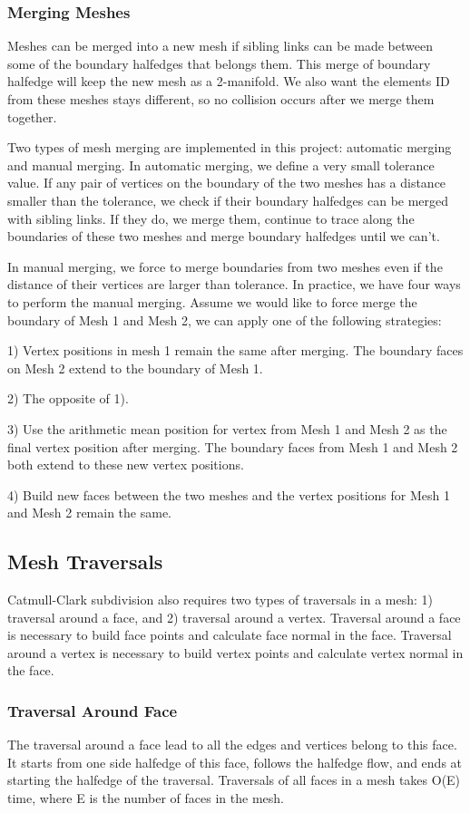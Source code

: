 \documentclass[12pt]{article}
\begin{document}
\subsubsection{Merging Meshes}
Meshes can be merged into a new mesh if sibling links can be made between some of the boundary halfedges that belongs them. This merge of boundary halfedge will keep the new mesh as a 2-manifold. We also want the elements ID from these meshes stays different, so no collision occurs after we merge them together.

Two types of mesh merging are implemented in this project: automatic merging and manual merging. In automatic merging, we define a very small tolerance value. If any pair of vertices on the boundary of the two meshes has a distance smaller than the tolerance, we check if their boundary halfedges can be merged with sibling links. If they do, we merge them, continue to trace along the boundaries of these two meshes and merge boundary halfedges until we can't.

In manual merging, we force to merge boundaries from two meshes even if the distance of their vertices are larger than tolerance. In practice, we have four ways to perform the manual merging. Assume we would like to force merge the boundary of Mesh 1 and Mesh 2, we can apply one of the following strategies:

1) Vertex positions in mesh 1 remain the same after merging. The boundary faces on Mesh 2 extend to the boundary of Mesh 1.

2) The opposite of 1).

3) Use the arithmetic mean position for vertex from Mesh 1 and Mesh 2 as the final vertex position after merging. The boundary faces from Mesh 1 and Mesh 2 both extend to these new vertex positions.

4) Build new faces between the two meshes and the vertex positions for Mesh 1 and Mesh 2 remain the same.

\subsection{Mesh Traversals} 
Catmull-Clark subdivision also requires two types of traversals in a mesh: 1) traversal around a face, and 2) traversal around a vertex. Traversal around a face is necessary to build face points and calculate face normal in the face. Traversal around a vertex is necessary to build vertex points and calculate vertex normal in the face.

\subsubsection{Traversal Around Face}
The traversal around a face lead to all the edges and vertices belong to this face. It starts from one side halfedge of this face, follows the halfedge flow, and ends at starting the halfedge of the traversal.
Traversals of all faces in a mesh takes O(E) time, where E is the number of faces in the mesh.
\end{document}
